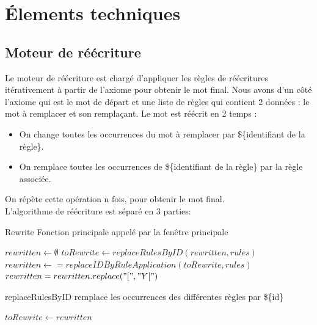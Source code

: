 \chapter{Élements techniques}

\section{Moteur de réécriture}

Le moteur de réécriture est chargé d'appliquer les règles de réécritures itérativement à partir de l'axiome pour obtenir le mot final.
Nous avons d'un côté l'axiome qui est le mot de départ et une liste de règles qui contient 2 données : le mot à remplacer et son remplaçant.
Le mot est réécrit en 2 temps :\\
\begin{itemize}
    \item On change toutes les occurrences du mot à remplacer par \$\{identifiant de la règle\}.
    \item On remplace toutes les occurrences de \$\{identifiant de la règle\} par la règle associée.
\end{itemize}
On répète cette opération n fois, pour obtenir le mot final.\\

L'algorithme de réécriture est séparé en 3 parties:\\

\begin{algorithm}
\DontPrintSemicolon
\KwIn{axiom: $String$, rules : $List[Tuple[String, String]$, recurrence: $Integer$}
\caption{{\sc Rewrite} Fonction principale appelé par la fenêtre principale}
$rewritten \gets \emptyset$\;
 {
    $toRewrite \gets replaceRulesByID(rewritten, rules)$\;
    $rewritten \gets = replaceIDByRuleApplication(toRewrite, rules)$\;
}
$rewritten = rewritten.replace("[", "Y[")$\;
\;
\end{algorithm}

\begin{algorithm}
\DontPrintSemicolon
\KwIn{rewritten: $String$, rules : $List[Tuple[String, String]$}
\caption{{\sc replaceRulesByID} remplace les occurrences des différentes règles par \$\{id\}}
$toRewrite \gets rewritten$\;

\end{algorithm}

